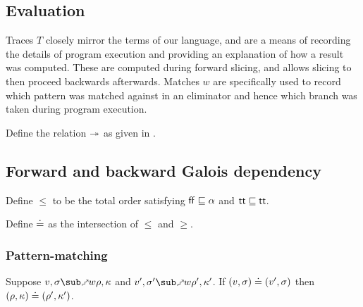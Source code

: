 \subsection{Evaluation}



Traces $T$ closely mirror the terms of our language, and are a means of recording the details of program execution and providing an explanation of how a result was computed. These are computed during forward slicing, and allows slicing to then proceed backwards afterwards. Matches $w$ are specifically used to record which pattern was matched against in an eliminator and hence which branch was taken during program execution. 





\begin{definition}
   \label{def:core-language:closeDefs}
   Define the relation $\twoheadrightarrow$ as given in .
\end{definition}

\subsection{Forward and backward Galois dependency}



\begin{definition}
   Define $\leq$ to be the total order satisfying $\mathsf{ff} \sqsubseteq \alpha$ and $\mathsf{tt} \sqsubseteq \mathsf{tt}$.
\end{definition}

\begin{definition}
   Define $\doteq$ as the intersection of $\leq$ and $\geq$.
\end{definition}




\subsubsection{Pattern-matching}




\begin{lemma}
   Suppose $v, \sigma \matchFwdR{w} \rho, \kappa$ and $v', \sigma' \matchFwdR{w} \rho', \kappa'$. If $(v, \sigma) \doteq (v', \sigma)$ then $(\rho, \kappa) \doteq (\rho', \kappa')$.
\end{lemma}

